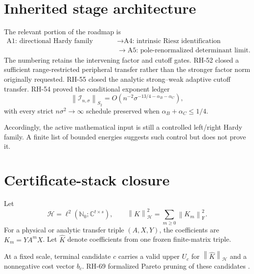 \documentclass[11pt]{article}
\theoremstyle{definition}
\newcommand{\norm}[1]{\left\lVert#1\right\rVert}
\newcommand{\HH}{\mathcal H}
\newcommand{\F}{\mathrm F}
\begin{document}
\section{Inherited stage architecture}
\label{sec:architecture}

The relevant portion of the roadmap is
\[
\begin{split}
 \text{A1: directional Hardy family bound}
 &\longrightarrow
 \text{A4: intrinsic Riesz identification}\\
 &\longrightarrow
 \text{A5: pole-renormalized determinant limit}.
\end{split}
\]
The numbering retains the intervening factor and cutoff gates.  RH-52 closed
a sufficient range-restricted peripheral transfer rather than the stronger
factor norm originally requested.  RH-55 closed the analytic strong--weak
adaptive cutoff transfer.  RH-54 proved the conditional exponent ledger
\[
 \norm{\mathcal I_{n,\sigma}}_{S_2}
 =O\!\left(
 n^{-2}\sigma^{-13/4-\alpha_B-\alpha_C}
 \right),
\]
with every strict $n\sigma^2\to\infty$ schedule preserved when
$\alpha_B+\alpha_C\le1/4$.

Accordingly, the active mathematical input is still a controlled left/right
Hardy family.  A finite list of bounded energies suggests such control but
does not prove it.

\section{Certificate-stack closure}
\label{sec:stack}

Let
\[
 \HH=\ell^2\!\left(\mathbb N_0;\mathbb C^{t\times s}\right),
 \qquad
 \norm K_{\HH}^2=\sum_{m\ge0}\norm{K_m}_{\F}^2.
\]
For a physical or analytic transfer triple $(A,X,Y)$, the coefficients are
$K_m=YA^mX$.  Let $\widehat K$ denote coefficients from one frozen
finite-matrix triple.

At a fixed scale, terminal candidate $c$ carries a valid upper $U_c$ for
$\norm{\widehat K}_{\HH}$ and a nonnegative cost vector $b_c$.  RH-69
formalized Pareto pruning of these candidates \citep{WangPortfolio2026}.
\end{document}
